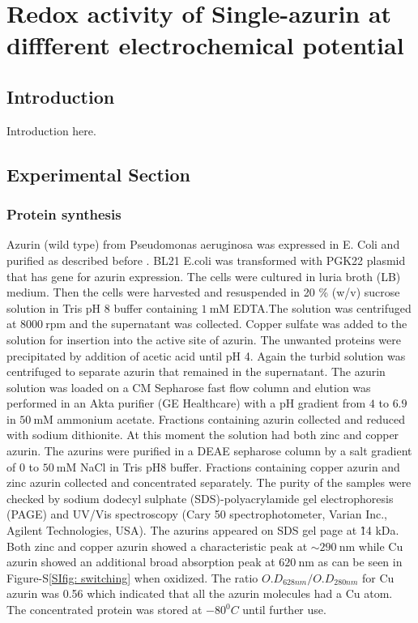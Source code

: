 \chapter{Redox activity of Single-azurin at diffferent electrochemical potential}
\graphicspath{{./chapters/c4_azurin_sm/main/}}
%  
\section{Introduction}
Introduction here.
\section{Experimental Section}
\subsection{Protein synthesis}
Azurin (wild type) from Pseudomonas aeruginosa was expressed in E. Coli and purified as described before \citep{kamp1990purification}. BL21 E.coli was transformed with PGK22 plasmid that has gene for azurin expression. The cells were cultured in luria broth (LB) medium. Then the cells were harvested and resuspended in 20 \% (w/v) sucrose solution in Tris pH 8 buffer containing $1~$mM EDTA.The solution was centrifuged at $8000~$rpm and the supernatant was collected. Copper sulfate was added to the solution for insertion into the active site of azurin. The unwanted proteins were precipitated by addition of acetic acid until pH 4. Again the turbid solution was centrifuged to separate azurin that remained in the supernatant. The azurin solution was loaded on a CM Sepharose fast flow column and elution was performed in an Akta purifier (GE Healthcare) with a pH gradient from $4$ to $6.9$ in $50~$mM ammonium acetate. Fractions containing azurin collected and reduced with sodium dithionite. At this moment the solution had both zinc and copper azurin. The azurins were purified in a DEAE sepharose column by a salt gradient of 0 to $50~$mM NaCl in Tris pH8 buffer. Fractions containing copper azurin and zinc azurin collected and concentrated separately. The purity of the samples were checked by sodium dodecyl sulphate (SDS)-polyacrylamide gel electrophoresis (PAGE) and UV/Vis spectroscopy (Cary 50 spectrophotometer, Varian Inc., Agilent Technologies, USA). The azurins appeared on SDS gel page at \~14 kDa. Both zinc and copper azurin showed a characteristic peak at ${\sim}290~$nm while Cu azurin showed an additional broad absorption peak at $620~$nm as can be seen in Figure-S\ref{SIfig: switching} when oxidized. The ratio $O.D_{628nm}/O.D_{280nm}$ for Cu azurin was 0.56 which indicated that all the azurin molecules had a Cu atom. The concentrated protein was stored at $-80^0 C$ until further use.

